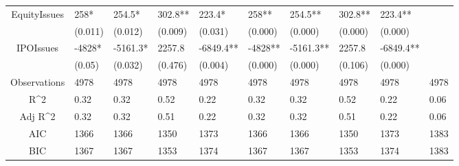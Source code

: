 \documentclass{article}
\begin{document}
\begin{table}[H]
\begin{tabular}{|clllllllll|}
  EquityIssues & 258* & 254.5* & 302.8** & 223.4* & 258** & 254.5** & 302.8** & 223.4** &  \\ 
   & (0.011) & (0.012) & (0.009) & (0.031) & (0.000) & (0.000) & (0.000) & (0.000) &  \\ 
  IPOIssues & -4828* & -5161.3* & 2257.8 & -6849.4** & -4828** & -5161.3** & 2257.8 & -6849.4** &  \\ 
   & (0.05) & (0.032) & (0.476) & (0.004) & (0.000) & (0.000) & (0.106) & (0.000) &  \\ 
  \hline 
 Observations & 4978 & 4978 & 4978 & 4978 & 4978 & 4978 & 4978 & 4978 & 4978 \\ 
  R^2 & 0.32 & 0.32 & 0.52 & 0.22 & 0.32 & 0.32 & 0.52 & 0.22 & 0.06 \\ 
  Adj R^2 & 0.32 & 0.32 & 0.51 & 0.22 & 0.32 & 0.32 & 0.51 & 0.22 & 0.06 \\ 
  AIC & 1366 & 1366 & 1350 & 1373 & 1366 & 1366 & 1350 & 1373 & 1383 \\ 
  BIC & 1367 & 1367 & 1353 & 1374 & 1367 & 1367 & 1353 & 1374 & 1383 \\ 
   \hline
\end{tabular}
 
\end{table}
\end{document}

